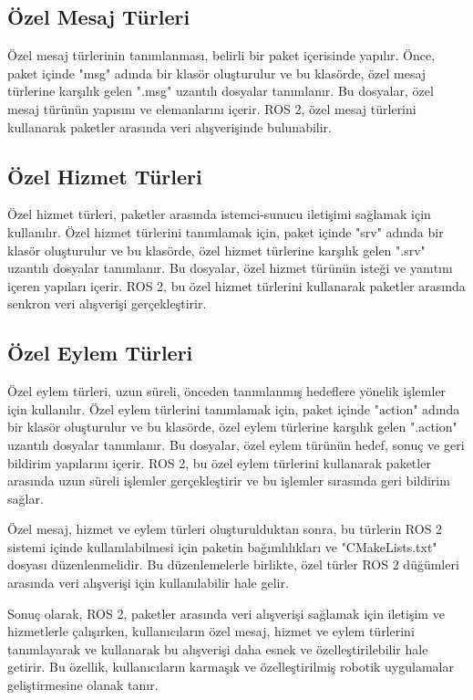             \subsection{Özel Mesaj Türleri}
            Özel mesaj türlerinin tanımlanması, belirli bir paket içerisinde yapılır. Önce, paket içinde "msg" adında bir klasör oluşturulur ve bu klasörde, özel mesaj türlerine karşılık gelen ".msg" uzantılı dosyalar tanımlanır. Bu dosyalar, özel mesaj türünün yapısını ve elemanlarını içerir. ROS 2, özel mesaj türlerini kullanarak paketler arasında veri alışverişinde bulunabilir.
            
            \subsection{Özel Hizmet Türleri}
            Özel hizmet türleri, paketler arasında istemci-sunucu iletişimi sağlamak için kullanılır. Özel hizmet türlerini tanımlamak için, paket içinde "srv" adında bir klasör oluşturulur ve bu klasörde, özel hizmet türlerine karşılık gelen ".srv" uzantılı dosyalar tanımlanır. Bu dosyalar, özel hizmet türünün isteği ve yanıtını içeren yapıları içerir. ROS 2, bu özel hizmet türlerini kullanarak paketler arasında senkron veri alışverişi gerçekleştirir.
            
            \subsection{Özel Eylem Türleri}
            Özel eylem türleri, uzun süreli, önceden tanımlanmış hedeflere yönelik işlemler için kullanılır. Özel eylem türlerini tanımlamak için, paket içinde "action" adında bir klasör oluşturulur ve bu klasörde, özel eylem türlerine karşılık gelen ".action" uzantılı dosyalar tanımlanır. Bu dosyalar, özel eylem türünün hedef, sonuç ve geri bildirim yapılarını içerir. ROS 2, bu özel eylem türlerini kullanarak paketler arasında uzun süreli işlemler gerçekleştirir ve bu işlemler sırasında geri bildirim sağlar.

            Özel mesaj, hizmet ve eylem türleri oluşturulduktan sonra, bu türlerin ROS 2 sistemi içinde kullanılabilmesi için paketin bağımlılıkları ve "CMakeLists.txt" dosyası düzenlenmelidir. Bu düzenlemelerle birlikte, özel türler ROS 2 düğümleri arasında veri alışverişi için kullanılabilir hale gelir.
            
            Sonuç olarak, ROS 2, paketler arasında veri alışverişi sağlamak için iletişim ve hizmetlerle çalışırken, kullanıcıların özel mesaj, hizmet ve eylem türlerini tanımlayarak ve kullanarak bu alışverişi daha esnek ve özelleştirilebilir hale getirir. Bu özellik, kullanıcıların karmaşık ve özelleştirilmiş robotik uygulamalar geliştirmesine olanak tanır.